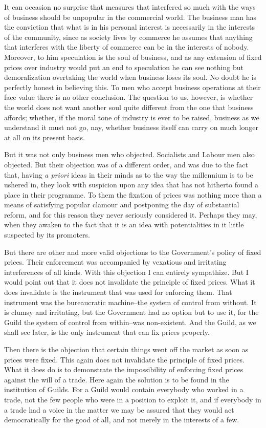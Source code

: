 \documentclass{book}
\begin{document}
It can occasion no surprise that measures that interfered so much with the ways of business should be unpopular in the commercial world. The business man has the conviction that what is in his personal interest is necessarily in the interests of the community, since as society lives by commerce he assumes that anything that interferes with the liberty of commerce can be in the interests of nobody. Moreover, to him speculation is the soul of business, and as any extension of fixed prices over industry would put an end to speculation he can see nothing but demoralization overtaking the world when business loses its soul. No doubt he is perfectly honest in believing this. To men who accept business operations at their face value there is no other conclusion. The question to us, however, is whether the world does not want another soul quite different from the one that business affords; whether, if the moral tone of industry is ever to be raised, business as we understand it must not go, nay, whether business itself can carry on much longer at all on its present basis.

But it was not only business men who objected. Socialists and Labour men also objected. But their objection was of a different order, and was due to the fact that, having \emph{a priori} ideas in their minds as to the way the millennium is to be ushered in, they look with suspicion upon any idea that has not hitherto found a place in their programme. To them the fixation of prices was nothing more than a means of satisfying popular clamour and postponing the day of substantial reform, and for this reason they never seriously considered it. Perhaps they may, when they awaken to the fact that it is an idea with potentialities in it little suspected by its promoters.

But there are other and more valid objections to the Government’s policy of fixed prices. Their enforcement was accompanied by vexatious and irritating interferences of all kinds. With this objection I can entirely sympathize. But I would point out that it does not invalidate the principle of fixed prices. What it does invalidate is the instrument that was used for enforcing them. That instrument was the bureaucratic machine–the system of control from without. It is clumsy and irritating, but the Government had no option but to use it, for the Guild the system of control from within–was non-existent. And the Guild, as we shall see later, is the only instrument that can fix prices properly.

Then there is the objection that certain things went off the market as soon as prices were fixed. This again does not invalidate the principle of fixed prices. What it does do is to demonstrate the impossibility of enforcing fixed prices against the will of a trade. Here again the solution is to be found in the institution of Guilds. For a Guild would contain everybody who worked in a trade, not the few people who were in a position to exploit it, and if everybody in a trade had a voice in the matter we may be assured that they would act democratically for the good of all, and not merely in the interests of a few.
\end{document}
